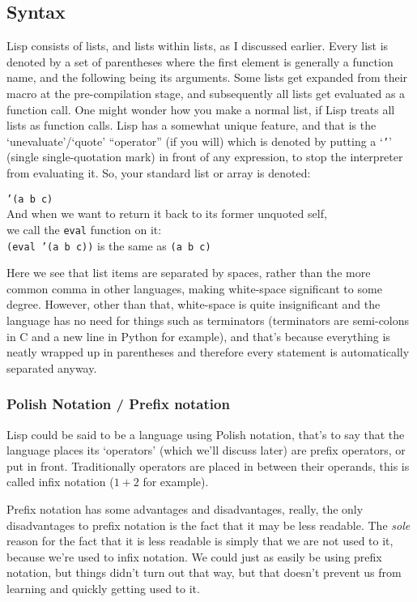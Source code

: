 \documentclass{article}
\newcommand{\code}[1]{\texttt{#1}}
\begin{document}
  \subsection{Syntax}
    Lisp consists of lists, and lists within lists,
    as I discussed earlier. Every list is denoted by a set of
    parentheses where the first element is generally a function name, and the
    following being its arguments. Some lists get expanded from their macro at
    the pre-compilation stage, and subsequently all lists get evaluated as a
    function call. One might wonder how you make a normal list, if Lisp treats
    all lists as function calls. Lisp has a somewhat unique feature, and that is
    the `unevaluate'/`quote' ``operator'' (if you will) which is denoted by
    putting
    a `\code{'}' (single single-quotation mark)
    in front of any expression, to stop the interpreter from evaluating it.
    So, your standard list or array is denoted:

    \begin{center}
      \code{'(a b c)}\\
      And when we want to return it back to its former unquoted self,\\
      we call the \code{eval} function on it:\\
      \code{(eval '(a b c))} is the same as \code{(a b c)}
    \end{center}

    Here we see that list items are separated by spaces, rather than the more
    common comma in other languages, making white-space significant to some
    degree. However, other than that, white-space is quite insignificant and
    the language has no need for things such as terminators (terminators are
    semi-colons in C and a new line in Python for example), and that's because
    everything is neatly wrapped up in parentheses and therefore every statement
    is automatically separated anyway.

    \subsubsection{Polish Notation / Prefix notation}
    Lisp could be said to be a language using Polish notation, that's to say
    that the language places its `operators' (which we'll discuss later) are
    prefix operators, or put in front.  Traditionally operators are placed in
    between their operands, this is called infix notation ($1 + 2$ for example).

    Prefix notation has some advantages and disadvantages, really, the only
    disadvantages to prefix notation is the fact that it may be less readable.
    The \emph{sole} reason for the fact that it is less readable is simply
    that we are not used to it, because we're used to infix notation.
    We could just as easily be using prefix notation, but things didn't turn out
    that way, but that doesn't prevent us from learning and quickly getting used
    to it.
\end{document}
